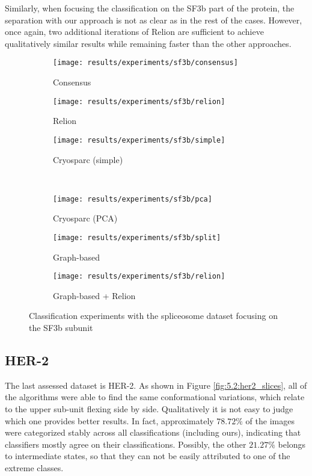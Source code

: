 \documentclass[../main.tex]{subfiles}
\begin{document}
Similarly, when focusing the classification on the SF3b part of the protein, the separation with our approach is not as clear as in the rest of the cases. However, once again, two additional iterations of Relion are sufficient to achieve qualitatively similar results while remaining faster than the other approaches. 

\begin{figure}[hbp]
    \centering
    \begin{subfigure}[b]{0.3\textwidth}
         \centering
         \texttt{[image: results/experiments/sf3b/consensus]}
         \caption{Consensus}
    \end{subfigure}
    \begin{subfigure}[b]{0.3\textwidth}
         \centering
         \texttt{[image: results/experiments/sf3b/relion]}
         \caption{Relion}
    \end{subfigure}
    \begin{subfigure}[b]{0.3\textwidth}
         \centering
         \texttt{[image: results/experiments/sf3b/simple]}
         \caption{Cryosparc (simple)}
    \end{subfigure}\\
    \vspace{1em}
    \begin{subfigure}[b]{0.3\textwidth}
         \centering
         \texttt{[image: results/experiments/sf3b/pca]}
         \caption{Cryosparc (PCA)}
    \end{subfigure}
    \begin{subfigure}[b]{0.3\textwidth}
         \centering
         \texttt{[image: results/experiments/sf3b/split]}
         \caption{Graph-based}
    \end{subfigure}
    \begin{subfigure}[b]{0.3\textwidth}
         \centering
         \texttt{[image: results/experiments/sf3b/relion]}
         \caption{Graph-based + Relion}
    \end{subfigure}
    \caption{Classification experiments with the spliceosome dataset focusing on the SF3b subunit}
    \label{fig:5.2:sf3b_slices}
\end{figure}


\subsection{HER-2}
The last assessed dataset is HER-2. As shown in Figure \ref{fig:5.2:her2_slices}, all of the algorithms were able to find the same conformational variations, which relate to the upper sub-unit flexing side by side. Qualitatively it is not easy to judge which one provides better results. In fact, approximately $78.72 \si{\percent}$ of the images were categorized stably across all classifications (including ours), indicating that classifiers mostly agree on their classifications. Possibly, the other $21.27 \si{\percent}$ belongs to intermediate states, so that they can not be easily attributed to one of the extreme classes.
\end{document}

